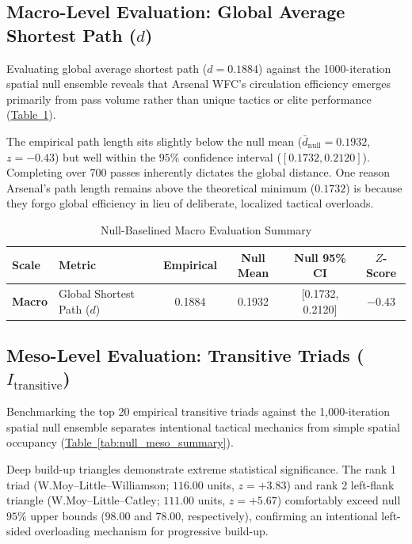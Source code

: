 \documentclass[12pt, a4paper]{article}
\begin{document}
\subsection{Macro-Level Evaluation: Global Average Shortest Path ($d$)}
\label{subsec:macro_evaluation}

Evaluating global average shortest path ($d = 0.1884$) against the 1000-iteration spatial null ensemble reveals that Arsenal WFC’s circulation efficiency emerges primarily from pass volume rather than unique tactics or elite performance (\hyperref[tab:null_macro_summary]{Table~\ref{tab:null_macro_summary}}).

The empirical path length sits slightly below the null mean ($\bar{d}_{\text{null}} = 0.1932$, $z = -0.43$) but well within the $95\%$ confidence interval ($[0.1732, 0.2120]$). Completing over 700 passes inherently dictates the global distance. One reason Arsenal's path length remains above the theoretical minimum ($0.1732$) is because they forgo global efficiency in lieu of deliberate, localized tactical overloads.

\begin{table}[htbp]
    \centering
    \scriptsize
    \caption{Null-Baselined Macro Evaluation Summary}
    \label{tab:null_macro_summary}
    \begin{tabularx}{0.85\textwidth}{l l c c c c}
        \toprule
        \textbf{Scale} & \textbf{Metric} & \textbf{Empirical} & \textbf{Null Mean} & \textbf{Null 95\% CI} & \textbf{$Z$-Score} \\
        \midrule
        \textbf{Macro} & Global Shortest Path ($d$) & 0.1884 & 0.1932 & [0.1732, 0.2120] & $-0.43$ \\
        \bottomrule
    \end{tabularx}
\end{table}

\subsection{Meso-Level Evaluation: Transitive Triads ($I_{\text{transitive}}$)}
\label{subsec:meso_evaluation}

Benchmarking the top 20 empirical transitive triads against the 1,000-iteration spatial null ensemble separates intentional tactical mechanics from simple spatial occupancy (\hyperref[tab:null_meso_summary]{Table~\ref{tab:null_meso_summary}}).

Deep build-up triangles demonstrate extreme statistical significance. The rank 1 triad (W.Moy--Little--Williamson; $116.00$ units, $z = +3.83$) and rank 2 left-flank triangle (W.Moy--Little--Catley; $111.00$ units, $z = +5.67$) comfortably exceed null $95\%$ upper bounds ($98.00$ and $78.00$, respectively), confirming an intentional left-sided overloading mechanism for progressive build-up.
\end{document}
